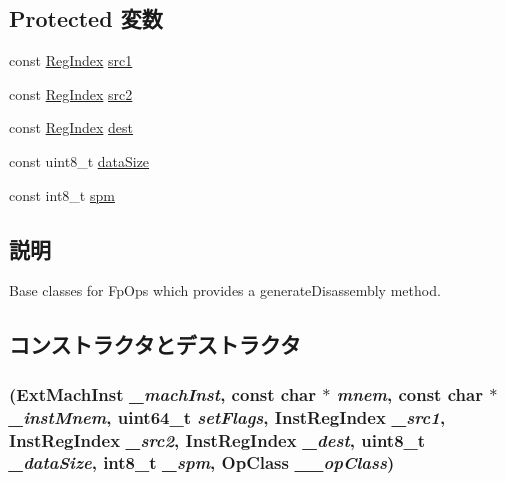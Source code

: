 \subsection*{Protected 変数}
\begin{DoxyCompactItemize}
\item 
const \hyperlink{classStaticInst_a36d25e03e43fa3bb4c5482cbefe5e0fb}{RegIndex} \hyperlink{classX86ISA_1_1FpOp_ac0ec0327e65bf2376ccab1d826a7094e}{src1}
\item 
const \hyperlink{classStaticInst_a36d25e03e43fa3bb4c5482cbefe5e0fb}{RegIndex} \hyperlink{classX86ISA_1_1FpOp_ae5f4f8a3a7b6e717a2cff2990c4ecfff}{src2}
\item 
const \hyperlink{classStaticInst_a36d25e03e43fa3bb4c5482cbefe5e0fb}{RegIndex} \hyperlink{classX86ISA_1_1FpOp_ab74217a19b7ae8f204175991a8087f1e}{dest}
\item 
const uint8\_\-t \hyperlink{classX86ISA_1_1FpOp_a107c258b340f17c2bfd8326ada8441ce}{dataSize}
\item 
const int8\_\-t \hyperlink{classX86ISA_1_1FpOp_a90fe61b3b78b03c3d2089b66581ae927}{spm}
\end{DoxyCompactItemize}


\subsection{説明}
Base classes for FpOps which provides a generateDisassembly method. 

\subsection{コンストラクタとデストラクタ}
\hypertarget{classX86ISA_1_1FpOp_aa567fa664fbeb3d523131d0f5d2c88c7}{
\subsubsection[{FpOp}]{ ({\bf ExtMachInst} {\em \_\-machInst}, \/  const char $\ast$ {\em mnem}, \/  const char $\ast$ {\em \_\-instMnem}, \/  uint64\_\-t {\em setFlags}, \/  {\bf InstRegIndex} {\em \_\-src1}, \/  {\bf InstRegIndex} {\em \_\-src2}, \/  {\bf InstRegIndex} {\em \_\-dest}, \/  uint8\_\-t {\em \_\-dataSize}, \/  int8\_\-t {\em \_\-spm}, \/  OpClass {\em \_\-\_\-opClass})}}
\label{classX86ISA_1_1FpOp_aa567fa664fbeb3d523131d0f5d2c88c7}




